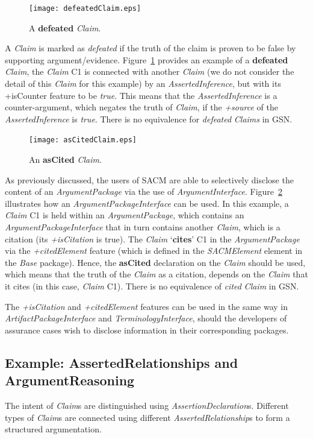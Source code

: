 \begin{figure}
	\centering
	\texttt{[image: defeatedClaim.eps]}
	\caption{A \textbf{defeated} \textit{Claim}.}
	\label{fig:defeatedClaim}
\end{figure}
A \textit{Claim} is marked as \textit{defeated} if the truth of the claim is proven to be false by supporting argument/evidence. 
Figure~\ref{fig:defeatedClaim} provides an example of a \textbf{defeated} \textit{Claim}, the \textit{Claim} C1 is connected with another \textit{Claim} (we do not consider the detail of this \textit{Claim} for this example) by an \textit{AssertedInference}, but with its +isCounter feature to be \textit{true}. 
This means that the \textit{AssertedInference} is a counter-argument, which negates the truth of \textit{Claim}, if the \textit{+source} of the \textit{AssertedInference} is \textit{true}.
There is no equivalence for \textit{defeated} \textit{Claims} in GSN.

\begin{figure}[ht!]
	\centering
	\texttt{[image: asCitedClaim.eps]}
	\caption{An \textbf{asCited} \textit{Claim}.}
	\label{fig:asCited}
\end{figure}

As previously discussed, the users of SACM are able to selectively disclose the content of an \textit{ArgumentPackage} via the use of \textit{ArgumentInterface}. 
Figure~\ref{fig:asCited} illustrates how an \textit{ArgumentPackageInterface} can be used. 
In this example, a \textit{Claim} C1 is held within an \textit{ArgumentPackage}, which contains an \textit{ArgumentPackageInterface} that in turn contains another \textit{Claim}, which is a citation (its \textit{+isCitation} is true). 
The \textit{Claim} `\textbf{cites}' C1 in the \textit{ArgumentPackage} via the \textit{+citedElement} feature (which is defined in the \textit{SACMElement} element in the \textit{Base} package). 
Hence, the \textbf{asCited} declaration on the \textit{Claim} should be used, which means that the truth of the \textit{Claim} as a citation, depends on the \textit{Claim} that it cites (in this case, \textit{Claim} C1).
There is no equivalence of \textit{cited} \textit{Claim} in GSN.

The \textit{+isCitation} and \textit{+citedElement} features can be used in the same way in \textit{ArtifactPackageInterface} and \textit{TerminologyInterface}, should the developers of assurance cases wish to disclose information in their corresponding packages.

\label{sec:confidence}
\subsection{Example: AssertedRelationships and ArgumentReasoning}
\label{sec:relationships}
The intent of \textit{Claim}s are distinguished using \textit{AssertionDeclaration}s. 
Different types of \textit{Claim}s are connected using different \textit{AssertedRelationship}s to form a structured argumentation. 

